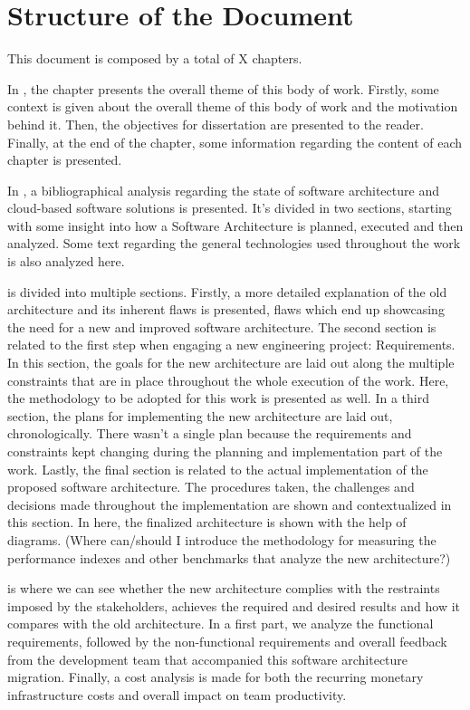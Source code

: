 \section{Structure of the Document}\label{intro:s:structure-of-the-document}

This document is composed by a total of X chapters.

In , the chapter presents the overall theme of this body of work. Firstly, some context is given about the overall theme of this body of work and the motivation behind it. Then, the objectives for dissertation are presented to the reader. Finally, at the end of the chapter, some information regarding the content of each chapter is presented.

In , a bibliographical analysis regarding the state of software architecture and cloud-based software solutions is presented. It’s divided in two sections, starting with some insight into how a Software Architecture is planned, executed and then analyzed. Some text regarding the general technologies used throughout the work is also analyzed here.

 is divided into multiple sections. Firstly, a more detailed explanation of the old architecture and its inherent flaws is presented, flaws which end up showcasing the need for a new and improved software architecture. The second section is related to the first step when engaging a new engineering project: Requirements. In this section, the goals for the new architecture are laid out along the multiple constraints that are in place throughout the whole execution of the work. Here, the methodology to be adopted for this work is presented as well. In a third section, the plans for implementing the new architecture are laid out, chronologically. There wasn’t a single plan because the requirements and constraints kept changing during the planning and implementation part of the work. Lastly, the final section is related to the actual implementation of the proposed software architecture. The procedures taken, the challenges and decisions made throughout the implementation are shown and contextualized in this section. In here, the finalized architecture is shown with the help of diagrams. (Where can/should I introduce the methodology for measuring the performance indexes and other benchmarks that analyze the new architecture?)

 is where we can see whether the new architecture complies with the restraints imposed by the stakeholders, achieves the required and desired results and how it compares with the old architecture. In a first part, we analyze the functional requirements, followed by the non-functional requirements and overall feedback from the development team that accompanied this software architecture migration. Finally, a cost analysis is made for both the recurring monetary infrastructure costs and overall impact on team productivity.

